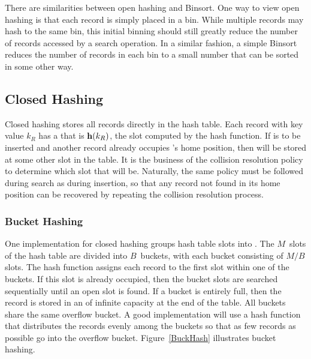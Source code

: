 There are similarities between open hashing and
Binsort.
One way to view open hashing is that each record is simply placed in a
bin. 
While multiple records may hash to the same bin, this initial binning
should still greatly reduce the number of records accessed by
a search operation.
In a similar fashion, a simple Binsort reduces the number of
records in each bin to a small number that can be sorted in some
other way.

\subsection{Closed Hashing}
\label{HashClose}

Closed hashing stores all records directly in the hash table.
Each record  with key value \(k_R\) has a
 that is
\( {\bf h}(k_R) \), the slot computed by the hash function.
If  is to be inserted and another record already
occupies 's home position, then  will be stored at
some other slot in the table.
It is the business of the collision resolution policy to determine
which slot that will be.
Naturally, the same policy must be followed during search as during
insertion, so that any record not found in its home position can
be recovered by repeating the collision resolution process.

\subsubsection{Bucket Hashing}

One implementation for closed hashing groups hash table slots into
.
The \(M\)~slots of the hash table are divided into
\(B\)~buckets, with each bucket consisting of \(M/B\) slots.
The hash function assigns each record to the first slot
within one of the buckets.
If this slot is already occupied, then the bucket slots are searched
sequentially until an open slot is found.
If a bucket is entirely full, then the record is stored in an
 of infinite capacity at the end of the table.
All buckets share the same overflow bucket.
A good implementation will use a hash function that distributes the
records evenly among the buckets so that as few records as
possible go into the overflow bucket.
Figure~\ref{BuckHash} illustrates bucket hashing.

